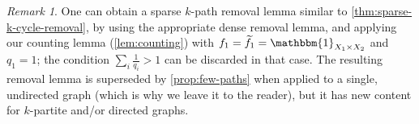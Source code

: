 \documentclass[reqno,11pt]{amsart}
\theoremstyle{definition}
\theoremstyle{remark}
\newtheorem*{remark}{Remark}
\numberwithin{equation}{section}
\newcommand{\one}{\mathbbm{1}}
\renewcommand{\tilde}{\widetilde}
\begin{document}
\begin{remark}
One can obtain a sparse $k$-path removal lemma similar to \cref{thm:sparse-k-cycle-removal}, by using the appropriate dense removal lemma, and applying our counting lemma (\cref{lem:counting}) with $f_1 = \tilde{f}_1 = \one_{X_1 \times X_2}$ and $q_1 = 1$; the condition $\sum_i \frac{1}{q_i} > 1$ can be discarded in that case. The resulting removal lemma is superseded by \cref{prop:few-paths} when applied to a single, undirected graph (which is why we leave it to the reader), but it has new content for $k$-partite and/or directed graphs. 
\end{remark}


   
\end{document}
